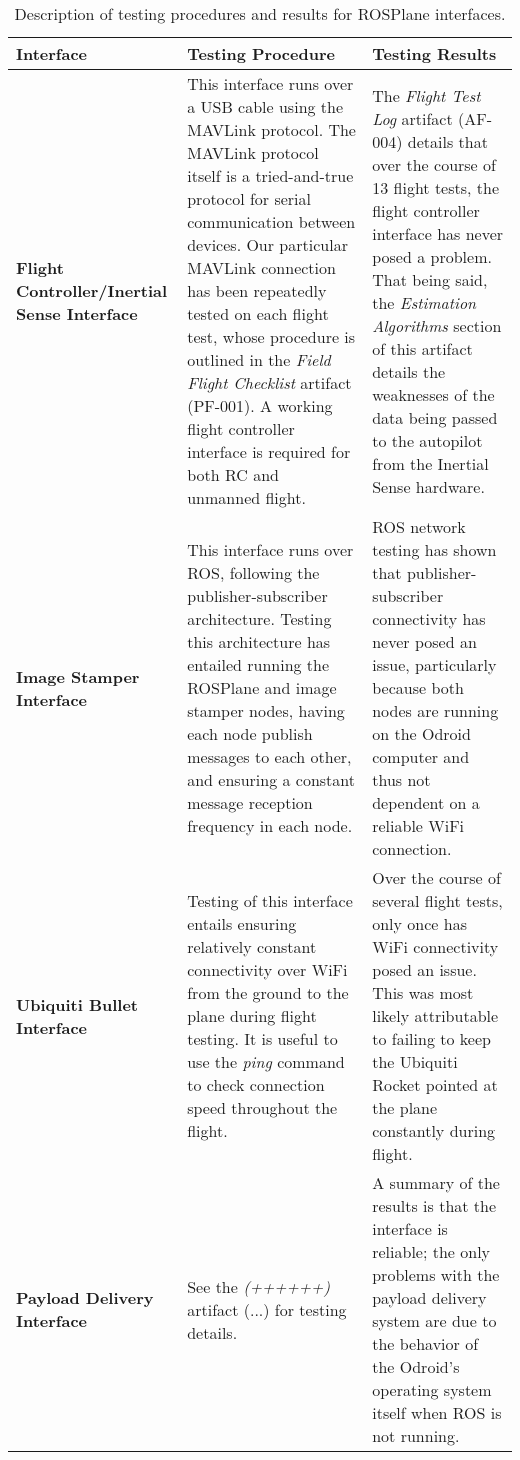 \documentclass[]{auvsi_doc}
\begin{document}
\begin{center}
	\begin{longtable}[H]{|P{4cm}|P{5.25cm}|P{5.25cm}|}
		\caption{Description of testing procedures and results for ROSPlane interfaces.}
		\label{tab:inttests}\\
		\hline
		{\color[HTML]{000000} \textbf{Interface}} & {\color[HTML]{000000}\textbf{Testing Procedure}}	& {\color[HTML]{000000}\textbf{Testing Results}} \\
		\hline
		\textbf{Flight Controller/Inertial Sense Interface}	& This interface runs over a USB cable using the MAVLink protocol. The MAVLink protocol itself is a tried-and-true protocol for serial communication between devices. Our particular MAVLink connection has been repeatedly tested on each flight test, whose procedure is outlined in the \textit{Field Flight Checklist} artifact (PF-001). A working flight controller interface is required for both RC and unmanned flight. &	The \textit{Flight Test Log} artifact (AF-004) details that over the course of 13 flight tests, the flight controller interface has never posed a problem. That being said, the \textit{Estimation Algorithms} section of this artifact details the weaknesses of the data being passed to the autopilot from the Inertial Sense hardware.\\
		\hline
		\textbf{Image Stamper Interface}	& This interface runs over ROS, following the publisher-subscriber architecture. Testing this architecture has entailed running the ROSPlane and image stamper nodes, having each node publish messages to each other, and ensuring a constant message reception frequency in each node. &	ROS network testing has shown that publisher-subscriber connectivity has never posed an issue, particularly because both nodes are running on the Odroid computer and thus not dependent on a reliable WiFi connection. \\
		\hline
		\textbf{Ubiquiti Bullet Interface}	& Testing of this interface entails ensuring relatively constant connectivity over WiFi from the ground to the plane during flight testing. It is useful to use the \textit{ping} command to check connection speed throughout the flight. &	Over the course of several flight tests, only once has WiFi connectivity posed an issue. This was most likely attributable to failing to keep the Ubiquiti Rocket pointed at the plane constantly during flight. \\
		\hline
		\textbf{Payload Delivery Interface}	& See the \textit{(++++++)} artifact (...) for testing details. &	A summary of the results is that the interface is reliable; the only problems with the payload delivery system are due to the behavior of the Odroid's operating system itself when ROS is not running. \\
		\hline
	\end{longtable}
\end{center}
\end{document}
